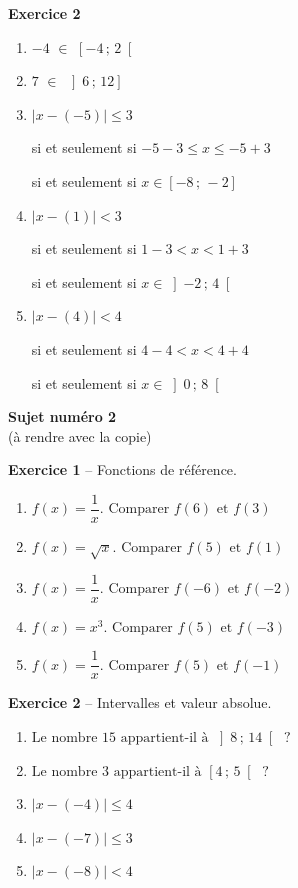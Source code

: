 \documentclass[12pt,a4paper,french]{article}
\begin{document}
\noindent\textbf{Exercice 2}\par
\smallskip
\begin{enumerate}
\item $-4$ $\in$ $\left[ -4 \,;\, 2 \right[$
\item $7$ $\in$ $\left] 6 \,;\, 12 \right]$
\item $|x - (-5)| \leqslant 3$

si et seulement si $-5 - 3 \leq x \leq -5 + 3$

si et seulement si $x \in \left[ -8 \,;\, -2 \right]$
\item $|x - (1)| < 3$

si et seulement si $1 - 3 < x < 1 + 3$

si et seulement si $x \in \left] -2 \,;\, 4 \right[$
\item $|x - (4)| < 4$

si et seulement si $4 - 4 < x < 4 + 4$

si et seulement si $x \in \left] 0 \,;\, 8 \right[$
\end{enumerate}
\medskip

\newpage
\begin{center}
\textbf{Sujet numéro 2}
\\(à rendre avec la copie)
\end{center}


\noindent\textbf{Exercice 1} -- Fonctions de référence.
\begin{enumerate}
\item $f(x) = \dfrac{1}{x}. \text{ Comparer } f(6) \text{ et } f(3)$
\item $f(x) = \sqrt{x}. \text{ Comparer } f(5) \text{ et } f(1)$
\item $f(x) = \dfrac{1}{x}. \text{ Comparer } f(-6) \text{ et } f(-2)$
\item $f(x) = x^3. \text{ Comparer } f(5) \text{ et } f(-3)$
\item $f(x) = \dfrac{1}{x}. \text{ Comparer } f(5) \text{ et } f(-1)$
\end{enumerate}
\bigskip

\noindent\textbf{Exercice 2} -- Intervalles et valeur absolue.
\begin{enumerate}
\item $\text{Le nombre } 15 \text{ appartient-il à } \left] 8 \,;\, 14 \right[ \text{ ?}$
\item $\text{Le nombre } 3 \text{ appartient-il à } \left[ 4 \,;\, 5 \right[ \text{ ?}$
\item $|x - (-4)| \leqslant 4$
\item $|x - (-7)| \leqslant 3$
\item $|x - (-8)| < 4$
\end{enumerate}
\bigskip
\end{document}
